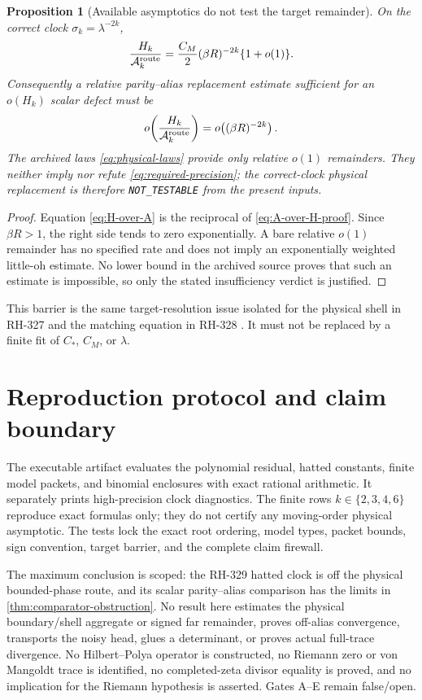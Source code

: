 \documentclass[11pt]{article}
\newtheorem{proposition}[theorem]{Proposition}
\theoremstyle{remark}
\newcommand{\cA}{\mathcal A}
\newcommand{\Hk}{H_k}
\begin{document}
\begin{proposition}[Available asymptotics do not test the target remainder]
\label{prop:not-testable}
On the correct clock $\sigma_k=\lambda^{-2k}$,
\begin{equation}\label{eq:H-over-A}
 \frac{\Hk}{\cA_k^{\rm route}}
 =\frac{C_M}{2}(\beta R)^{-2k}\{1+o(1)\}.
\end{equation}
Consequently a relative parity--alias replacement estimate sufficient for an
$o(\Hk)$ scalar defect must be
\begin{equation}\label{eq:required-precision}
 o\!\left(\frac{\Hk}{\cA_k^{\rm route}}\right)
 =o\!\left((\beta R)^{-2k}\right).
\end{equation}
The archived laws \eqref{eq:physical-laws} provide only relative $o(1)$
remainders.  They neither imply nor refute \eqref{eq:required-precision}; the
correct-clock physical replacement is therefore \texttt{NOT\_TESTABLE} from
the present inputs.
\end{proposition}

\begin{proof}
Equation \eqref{eq:H-over-A} is the reciprocal of
\eqref{eq:A-over-H-proof}.  Since $\beta R>1$, the right side tends to zero
exponentially.  A bare relative $o(1)$ remainder has no specified rate and
does not imply an exponentially weighted little-oh estimate.  No lower
bound in the archived source proves that such an estimate is impossible,
so only the stated insufficiency verdict is justified.
\end{proof}

This barrier is the same target-resolution issue isolated for the physical
shell in RH-327 and the matching equation in RH-328
\citep{WangShellBudget2026,WangMatching2026}.  It must not be replaced by a
finite fit of $C_*$, $C_M$, or $\lambda$.

\section{Reproduction protocol and claim boundary}

The executable artifact evaluates the polynomial residual, hatted constants,
finite model packets, and binomial enclosures with exact rational arithmetic.
It separately prints high-precision clock diagnostics.  The finite rows
$k\in\{2,3,4,6\}$ reproduce exact formulas only; they do not certify any
moving-order physical asymptotic.  The tests lock the exact root ordering,
model types, packet bounds, sign convention, target barrier, and the complete
claim firewall.

The maximum conclusion is scoped: the RH-329 hatted clock is off the physical
bounded-phase route, and its scalar parity--alias comparison has the limits
in \cref{thm:comparator-obstruction}.  No result here estimates the physical
boundary/shell aggregate or signed far remainder, proves off-alias
convergence, transports the noisy head, glues a determinant, or proves actual
full-trace divergence.  No Hilbert--Polya operator is constructed, no
Riemann zero or von Mangoldt trace is identified, no completed-zeta divisor
equality is proved, and no implication for the Riemann hypothesis is
asserted.  Gates A--E remain false/open.



\end{document}
